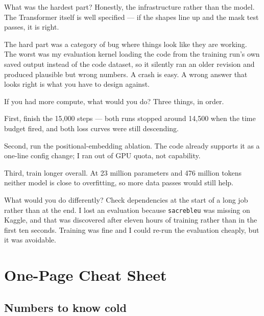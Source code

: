 \documentclass[11pt]{report}
\newcommand{\p}[1]{\texttt{#1}}
\begin{document}
\begin{qabox}{What was the hardest part?}
Honestly, the infrastructure rather than the model. The Transformer itself is well
specified --- if the shapes line up and the mask test passes, it is right.

The hard part was a category of bug where things look like they are working. The
worst was my evaluation kernel loading the code from the training run's own saved
output instead of the code dataset, so it silently ran an older revision and
produced plausible but wrong numbers. A crash is easy. A wrong answer that looks
right is what you have to design against.
\end{qabox}

\begin{qabox}{If you had more compute, what would you do?}
Three things, in order.

First, finish the 15,000 steps --- both runs stopped around 14,500 when the time
budget fired, and both loss curves were still descending.

Second, run the positional-embedding ablation. The code already supports it as a
one-line config change; I ran out of GPU quota, not capability.

Third, train longer overall. At 23 million parameters and 476 million tokens
neither model is close to overfitting, so more data passes would still help.
\end{qabox}

\begin{qabox}{What would you do differently?}
Check dependencies at the start of a long job rather than at the end. I lost an
evaluation because \p{sacrebleu} was missing on Kaggle, and that was discovered
after eleven hours of training rather than in the first ten seconds. Training was
fine and I could re-run the evaluation cheaply, but it was avoidable.
\end{qabox}

\chapter{One-Page Cheat Sheet}
\label{ch:cheatsheet}

\section{Numbers to know cold}
\end{document}
